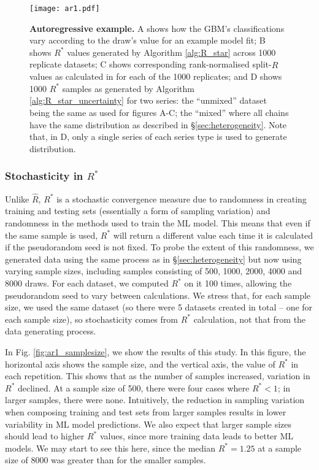 \documentclass{article}
\begin{document}
\begin{figure}[!htb]
	\centerline{\texttt{[image: ar1.pdf]}}
	\caption{\textbf{Autoregressive example.} A shows how the GBM's classifications vary according to the draw's value for an example model fit; B shows $R^*$ values generated by Algorithm \ref{alg:R_star} across 1000 replicate datasets; C shows corresponding rank-normalised split-$\widehat{R}$ values as calculated in \cite{vehtari2019rank} for each of the 1000 replicates; and D shows 1000 $R^*$ samples as generated by Algorithm \ref{alg:R_star_uncertainty} for two series: the ``unmixed'' dataset being the same as used for figures A-C; the ``mixed'' where all chains have the same distribution as described in \S\ref{sec:heterogeneity}. Note that, in D, only a single series of each series type is used to generate distribution.}
	\label{fig:ar1}
\end{figure}

\subsubsection{Stochasticity in $R^*$}\label{sec:heterogeneity_stochasticity}
Unlike $\widehat{R}$, $R^*$ is a stochastic convergence measure due to randomness in creating training and testing sets (essentially a form of sampling variation) and randomness in the methods used to train the ML model. This means that even if the same sample is used, $R^*$ will return a different value each time it is calculated if the pseudorandom seed is not fixed. To probe the extent of this randomness, we generated data using the same process as in \S\ref{sec:heterogeneity} but now using varying sample sizes, including samples consisting of 500, 1000, 2000, 4000 and 8000 draws. For each dataset, we computed $R^*$ on it 100 times, allowing the pseudorandom seed to vary between calculations. We stress that, for each sample size, we used the same dataset (so there were 5 datasets created in total -- one for each sample size), so stochasticity comes from $R^*$ calculation, not that from the data generating process.

In Fig. \ref{fig:ar1_samplesize}, we show the results of this study. In this figure, the horizontal axis shows the sample size, and the vertical axis, the value of $R^*$ in each repetition. This shows that as the number of samples increased, variation in $R^*$ declined. At a sample size of 500, there were four cases where $R^*<1$; in larger samples, there were none. Intuitively, the reduction in sampling variation when composing training and test sets from larger samples results in lower variability in ML model predictions. We also expect that larger sample sizes should lead to higher $R^*$ values, since more training data leads to better ML models. We may start to see this here, since the median $R^*=1.25$ at a sample size of 8000 was greater than for the smaller samples. 
\end{document}
